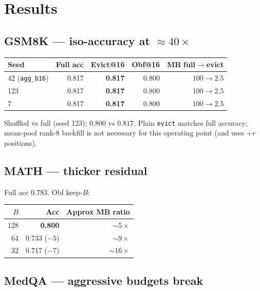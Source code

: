 \documentclass[11pt]{article}
\begin{document}
\section{Results}

\subsection{GSM8K --- iso-accuracy at $\approx 40\times$}

\begin{center}
\begin{tabular}{@{}lrrrr@{}}
\toprule
Seed & Full acc & Evict@16 & Obf@16 & MB full$\to$evict \\
\midrule
42 (\texttt{agg\_b16}) & 0.817 & \textbf{0.817} & 0.800 & $100\to 2.5$ \\
123 & 0.817 & \textbf{0.817} & 0.800 & $100\to 2.5$ \\
7 & 0.817 & \textbf{0.817} & 0.800 & $100\to 2.5$ \\
\bottomrule
\end{tabular}
\end{center}

Shuffled vs full (seed 123): $0.800$ vs $0.817$. Plain \texttt{evict} matches
full accuracy; mean-pool rank-$8$ backfill is not necessary for this operating
point (and uses $+r$ positions).

\subsection{MATH --- thicker residual}

Full acc $0.783$. Obf keep-$B$:

\begin{center}
\begin{tabular}{@{}rrr@{}}
\toprule
$B$ & Acc & Approx MB ratio \\
\midrule
128 & \textbf{0.800} & $\sim\!5\times$ \\
64 & 0.733 ($-5$) & $\sim\!9\times$ \\
32 & 0.717 ($-7$) & $\sim\!16\times$ \\
\bottomrule
\end{tabular}
\end{center}

\subsection{MedQA --- aggressive budgets break}
\end{document}
